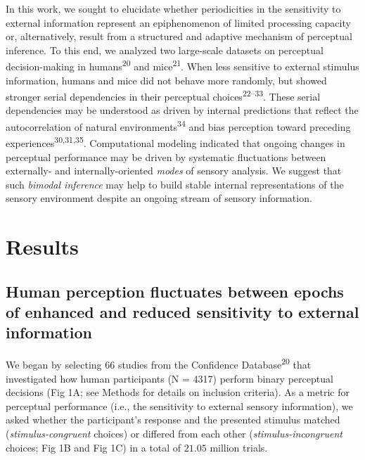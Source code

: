 \documentclass[
]{article}
\begin{document}
In this work, we sought to elucidate whether periodicities in the
sensitivity to external information represent an epiphenomenon of
limited processing capacity or, alternatively, result from a structured
and adaptive mechanism of perceptual inference. To this end, we analyzed
two large-scale datasets on perceptual decision-making in
humans\textsuperscript{20} and mice\textsuperscript{21}. When less
sensitive to external stimulus information, humans and mice did not
behave more randomly, but showed stronger serial dependencies in their
perceptual choices\textsuperscript{22--33}. These serial dependencies
may be understood as driven by internal predictions that reflect the
autocorrelation of natural environments\textsuperscript{34} and bias
perception toward preceding experiences\textsuperscript{30,31,35}.
Computational modeling indicated that ongoing changes in perceptual
performance may be driven by systematic fluctuations between externally-
and internally-oriented \emph{modes} of sensory analysis. We suggest
that such \emph{bimodal inference} may help to build stable internal
representations of the sensory environment despite an ongoing stream of
sensory information.

\hypertarget{results}{%
\section{Results}\label{results}}

\hypertarget{human-perception-fluctuates-between-epochs-of-enhanced-and-reduced-sensitivity-to-external-information}{%
\subsection{Human perception fluctuates between epochs of enhanced and
reduced sensitivity to external
information}\label{human-perception-fluctuates-between-epochs-of-enhanced-and-reduced-sensitivity-to-external-information}}

We began by selecting 66 studies from the Confidence
Database\textsuperscript{20} that investigated how human participants (N
= 4317) perform binary perceptual decisions (Fig 1A; see Methods for
details on inclusion criteria). As a metric for perceptual performance
(i.e., the sensitivity to external sensory information), we asked
whether the participant's response and the presented stimulus matched
(\emph{stimulus-congruent} choices) or differed from each other
(\emph{stimulus-incongruent} choices; Fig 1B and Fig 1C) in a total of
\(21.05\) million trials.
\end{document}
